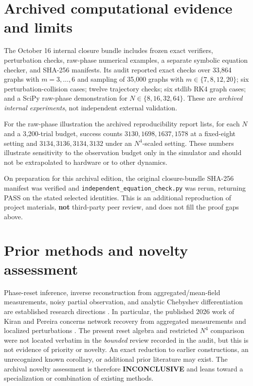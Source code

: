 \documentclass[11pt,a4paper]{article}
\begin{document}
\section{Archived computational evidence and limits}
The October 16 internal closure bundle includes frozen exact verifiers, perturbation checks, raw-phase numerical examples, a separate symbolic equation checker, and SHA-256 manifests. Its audit reported exact checks over 33,864 graphs with $m=3,\ldots,6$ and sampling of 35,000 graphs with $m\in\{7,8,12,20\}$; six perturbation-collision cases; twelve trajectory checks; six stdlib RK4 graph cases; and a SciPy raw-phase demonstration for $N\in\{8,16,32,64\}$. These are \emph{archived internal experiments}, not independent external validation.

For the raw-phase illustration the archived reproducibility report lists, for each $N$ and a 3,200-trial budget, success counts $3130,1698,1637,1578$ at a fixed-eight setting and $3134,3136,3134,3132$ under an $N^4$-scaled setting. These numbers illustrate sensitivity to the observation budget only in the simulator and should not be extrapolated to hardware or to other dynamics.

On preparation for this archival edition, the original closure-bundle SHA-256 manifest was verified and \texttt{independent\_equation\_check.py} was rerun, returning PASS on the stated selected identities. This is an additional reproduction of project materials, \textbf{not} third-party peer review, and does not fill the proof gaps above.
\section{Prior methods and novelty assessment}
Phase-reset inference, inverse reconstruction from aggregated/mean-field measurements, noisy partial observation, and analytic Chebyshev differentiation are established research directions \cite{levnajic2011,pikovsky2018,kiran2026,berry2025,reddy2005}. In particular, the published 2026 work of Kiran and Pereira concerns network recovery from aggregated measurements and localized perturbations \cite{kiran2026}. The present reset algebra and restricted $N^4$ comparison were not located verbatim in the \emph{bounded} review recorded in the audit, but this is not evidence of priority or novelty. An exact reduction to earlier constructions, an unrecognized known corollary, or additional prior literature may exist. The archival novelty assessment is therefore \textbf{INCONCLUSIVE} and leans toward a specialization or combination of existing methods.
\end{document}
